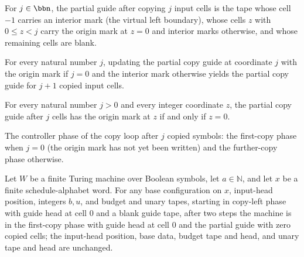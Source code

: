\begin{definition}
\label{Complexity.copyGuide}
\leanok
{}
For $j \in \bbn$, the partial guide after copying $j$ input cells is the tape whose
cell $-1$ carries an interior mark (the virtual left boundary), whose cells $z$ with
$0 \le z < j$ carry the origin mark at $z = 0$ and interior marks otherwise, and whose
remaining cells are blank.
\end{definition}

\begin{lemma}
\label{Complexity.copyGuide_next}
\leanok
{}
For every natural number $j$, updating the partial copy guide at coordinate $j$ with the
origin mark if $j=0$ and the interior mark otherwise yields the partial copy guide for
$j+1$ copied input cells.
\end{lemma}

\begin{lemma}
\label{Complexity.copyGuide_origin}
\leanok
{}
For every natural number $j>0$ and every integer coordinate $z$, the partial copy guide
after $j$ cells has the origin mark at $z$ if and only if $z=0$.
\end{lemma}

\begin{definition}
\label{Complexity.copyPhase}
\leanok
{}
The controller phase of the copy loop after $j$ copied symbols: the first-copy phase
when $j = 0$ (the origin mark has not yet been written) and the further-copy phase
otherwise.
\end{definition}

\begin{lemma}
\label{Complexity.setupCfg_copy_left}
\leanok
{}
Let $W$ be a finite Turing machine over Boolean symbols, let $a\in\mathbb{N}$, and let
$x$ be a finite schedule-alphabet word. For any base configuration on $x$, input-head
position, integers $b,u$, and budget and unary tapes, starting in copy-left phase with
guide head at cell $0$ and a blank guide tape, after two steps the machine is in the
first-copy phase with guide head at cell $0$ and the partial guide with zero copied
cells; the input-head position, base data, budget tape and head, and unary tape and head
are unchanged.
\end{lemma}

